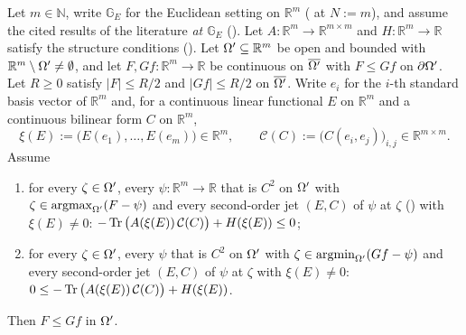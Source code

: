 \begin{theorem}[The case $r=1$ applied in $\mathbb R^{m}$]
Let $m\in\mathbb N$, write $\mathbb G_E$ for the Euclidean setting on $\mathbb R^{m}$
( at $N:=m$), and assume the cited results of the literature
\emph{at $\mathbb G_E$} (). Let
$A:\mathbb R^{m}\to\mathbb R^{m\times m}$ and $H:\mathbb R^{m}\to\mathbb R$ satisfy the
structure conditions (). Let
$\Omega'\subseteq\mathbb R^{m}$ be open and bounded with
$\mathbb R^{m}\setminus\Omega'\ne\emptyset$, and let $F,Gf:\mathbb R^{m}\to\mathbb R$ be continuous
on $\overline{\Omega'}$ with $F\le Gf$ on $\partial\Omega'$. Let $R\ge0$ satisfy $|F|\le R/2$ and
$|Gf|\le R/2$ on $\overline{\Omega'}$. Write $e_i$ for the $i$-th standard basis vector of
$\mathbb R^{m}$ and, for a continuous linear functional $E$ on $\mathbb R^{m}$ and a
continuous bilinear form $C$ on $\mathbb R^{m}$,
\[
 \xi(E):=\big(E(e_1),\ldots,E(e_m)\big)\in\mathbb R^{m},\qquad
 \mathcal C(C):=\big(C(e_i,e_j)\big)_{i,j}\in\mathbb R^{m\times m} .
\]
Assume
\begin{enumerate}
\item for every $\zeta\in\Omega'$, every $\psi:\mathbb R^{m}\to\mathbb R$ that is $C^{2}$ on
  $\Omega'$ with $\zeta\in\operatorname*{argmax}_{\Omega'}(F-\psi)$ and every second-order jet $(E,C)$ of $\psi$
  at $\zeta$ () with $\xi(E)\ne0$:
  $-\operatorname{Tr}\big(A(\xi(E))\,\mathcal C(C)\big)+H(\xi(E))\le0$;
\item for every $\zeta\in\Omega'$, every $\psi$ that is $C^{2}$ on $\Omega'$ with
  $\zeta\in\operatorname*{argmin}_{\Omega'}(Gf-\psi)$ and every second-order jet $(E,C)$ of $\psi$ at $\zeta$
  with $\xi(E)\ne0$: $0\le-\operatorname{Tr}\big(A(\xi(E))\,\mathcal C(C)\big)+H(\xi(E))$.
\end{enumerate}
Then $F\le Gf$ in $\Omega'$.
\end{theorem}
